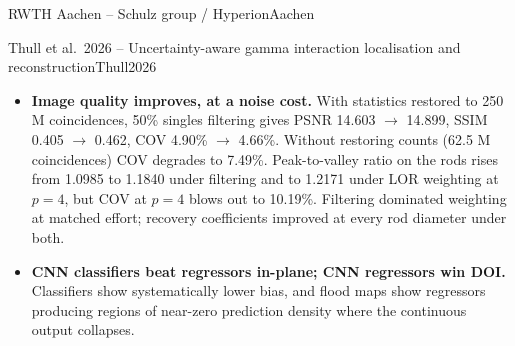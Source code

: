 \begin{programnote}{RWTH Aachen -- Schulz group / Hyperion}{Aachen}
\begin{papernote}{Thull et al.\ 2026 -- Uncertainty-aware gamma interaction localisation and reconstruction}{Thull2026}
\begin{itemize}
        monolithic and DOI dimensions) that energy windowing discards but variance
        filtering retains; the authors speculate these are geometrically well-constrained
        events occurring directly above a SiPM.
    \item \textbf{Image quality improves, at a noise cost.} With statistics restored to
        250 M coincidences, 50\% singles filtering gives PSNR 14.603 $\to$ 14.899,
        SSIM 0.405 $\to$ 0.462, COV 4.90\% $\to$ 4.66\%. Without restoring counts
        (62.5 M coincidences) COV degrades to 7.49\%. Peak-to-valley ratio on the 
        rods rises from 1.0985 to 1.1840 under filtering and to 1.2171 under LOR weighting
        at $p = 4$, but COV at $p = 4$ blows out to 10.19\%. Filtering dominated weighting
        at matched effort; recovery coefficients improved at every rod diameter under both.
    \item \textbf{CNN classifiers beat regressors in-plane; CNN regressors win DOI.}
        Classifiers show systematically lower bias, and flood maps show regressors
        producing regions of near-zero prediction density where the continuous output
        collapses.
\end{itemize}


\end{papernote}
\end{programnote}
